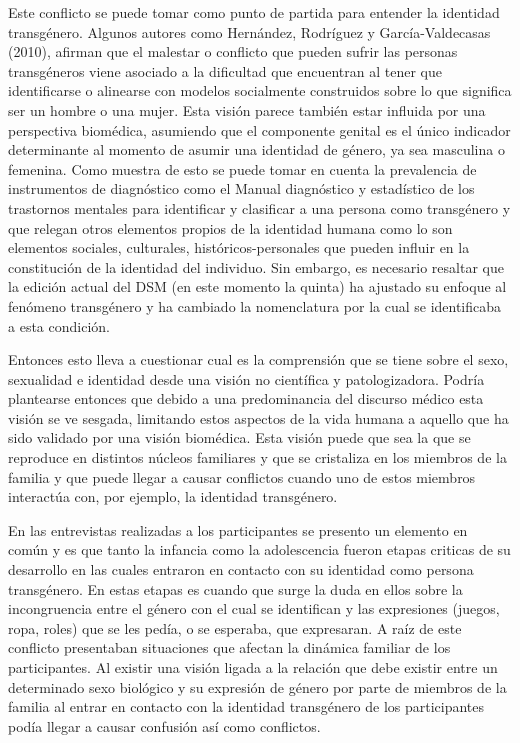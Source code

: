 Este conflicto se puede tomar como punto de partida para entender la identidad
transgénero. Algunos autores como Hernández, Rodríguez y
García-Valdecasas (2010), afirman que el malestar o conflicto que pueden sufrir
las personas transgéneros viene asociado a la dificultad que encuentran al tener
que identificarse o alinearse con modelos socialmente construidos sobre lo que
significa ser un hombre o una mujer. Esta visión parece también estar influida
por una perspectiva biomédica, asumiendo que el componente genital es el único
indicador determinante al momento de asumir una identidad de género, ya sea
masculina o femenina. Como muestra de esto se puede tomar en cuenta la
prevalencia de instrumentos de diagnóstico como el Manual diagnóstico y
estadístico de los trastornos mentales para identificar y clasificar a
una persona como transgénero y que relegan otros elementos propios de la
identidad humana como lo son elementos sociales, culturales,
históricos-personales que pueden influir en la constitución de la identidad del
individuo. Sin embargo, es necesario resaltar que la edición actual del DSM
(en este momento la quinta) ha ajustado su enfoque al fenómeno transgénero y ha
cambiado la nomenclatura por la cual se identificaba a esta condición.

Entonces esto lleva a cuestionar cual es la comprensión que se tiene sobre el
sexo, sexualidad e identidad desde una visión no científica y patologizadora.
Podría plantearse entonces que debido a una predominancia del discurso médico
esta visión se ve sesgada, limitando estos aspectos de la vida humana a aquello
que ha sido validado por una visión biomédica. Esta visión puede que sea la
que se reproduce en distintos núcleos familiares y que se cristaliza en los
miembros de la familia y que puede llegar a causar conflictos cuando uno de
estos miembros interactúa con, por ejemplo, la identidad transgénero.

En las entrevistas realizadas a los participantes se presento un elemento en
común y es que tanto la infancia como la adolescencia fueron etapas criticas de
su desarrollo en las cuales entraron en contacto con su identidad como persona
transgénero. En estas etapas es cuando que surge la duda en ellos sobre la
incongruencia entre el género con el cual se identifican y las expresiones
(juegos, ropa, roles) que se les pedía, o se esperaba, que expresaran. A raíz de
este conflicto presentaban situaciones que afectan la dinámica familiar de los
participantes. Al existir una visión ligada a la relación que debe existir
entre un determinado sexo biológico y su expresión de género por parte de
miembros de la familia al entrar en contacto con la identidad transgénero de los
participantes podía llegar a causar confusión así como conflictos.

